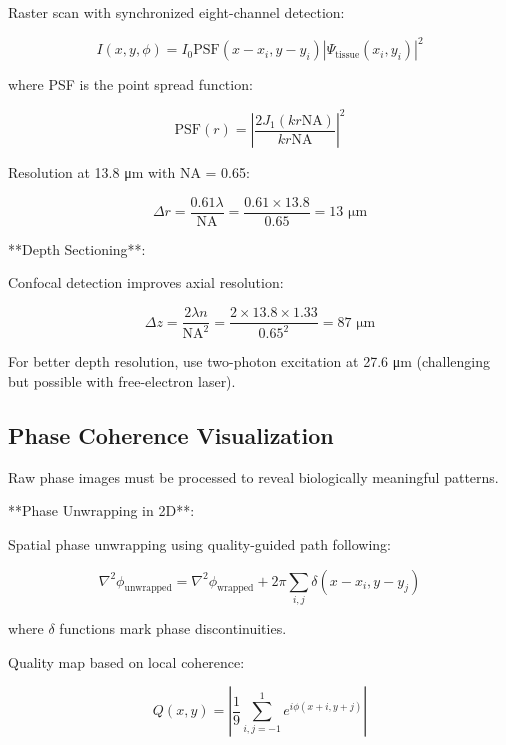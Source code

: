 \documentclass[12pt,a4paper]{report}
\begin{document}
Raster scan with synchronized eight-channel detection:

\begin{equation}
I(x, y, \phi) = I_0 \text{PSF}(x - x_i, y - y_i) |\Psi_{\text{tissue}}(x_i, y_i)|^2
\end{equation}

where PSF is the point spread function:

\begin{equation}
\text{PSF}(r) = \left|\frac{2J_1(kr \text{NA})}{kr \text{NA}}\right|^2
\end{equation}

Resolution at 13.8 μm with NA = 0.65:

\begin{equation}
\Delta r = \frac{0.61\lambda}{\text{NA}} = \frac{0.61 \times 13.8}{0.65} = 13 \text{ μm}
\end{equation}

**Depth Sectioning**:

Confocal detection improves axial resolution:

\begin{equation}
\Delta z = \frac{2\lambda n}{\text{NA}^2} = \frac{2 \times 13.8 \times 1.33}{0.65^2} = 87 \text{ μm}
\end{equation}

For better depth resolution, use two-photon excitation at 27.6 μm (challenging but possible with free-electron laser).

\subsection{Phase Coherence Visualization}

Raw phase images must be processed to reveal biologically meaningful patterns.

**Phase Unwrapping in 2D**:

Spatial phase unwrapping using quality-guided path following:

\begin{equation}
\nabla^2 \phi_{\text{unwrapped}} = \nabla^2 \phi_{\text{wrapped}} + 2\pi \sum_{i,j} \delta(x - x_i, y - y_j)
\end{equation}

where $\delta$ functions mark phase discontinuities.

Quality map based on local coherence:

\begin{equation}
Q(x, y) = \left|\frac{1}{9} \sum_{i,j=-1}^{1} e^{i\phi(x+i, y+j)}\right|
\end{equation}
\end{document}
